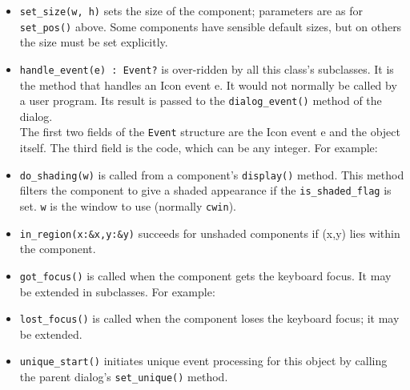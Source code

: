 \begin{itemize}
\item\noindent\texttt{set\_size(w, h)} sets the size of the component; parameters are as
for \texttt{set\_pos()} above. Some components have sensible default sizes,
but on others the size must be set explicitly.

\item\noindent\texttt{handle\_event(e) : Event?} is over-ridden by all this
class's subclasses. It is the method that handles an
Icon event e. It would not normally be called by a user program. Its
result is passed to the \texttt{dialog\_event()} method of the dialog.\\
The first two fields of the  \texttt{Event} structure are the Icon event e and the
object itself. The third field is the code, which can be any integer.
For example:


\item\noindent\texttt{do\_shading(w)} is called from a component's
\texttt{display()}
method. This method filters the component to give a shaded appearance
if the \texttt{is\_shaded\_flag} is set. \texttt{w} is the window to
use (normally \texttt{cwin}).

\item\noindent\texttt{in\_region(x:\&x,y:\&y)} succeeds for unshaded components if
(x,y) lies within the component.

\item\noindent\texttt{got\_focus()} is called when the component gets the keyboard focus. It
may be extended in subclasses. For example:


\item\noindent\texttt{lost\_focus()} is called when the component loses the keyboard focus; it
may be extended.

\item\noindent\texttt{unique\_start()} initiates unique event processing for this object by
calling the parent dialog's \texttt{set\_unique()}
method.


\end{itemize}
